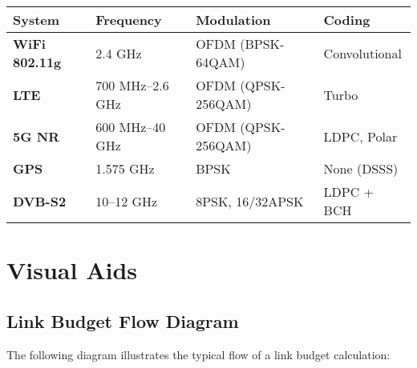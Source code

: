 \begin{center}
\begin{tabular}{@{}llll@{}}
\toprule
System & Frequency & Modulation & Coding \\
\midrule
\textbf{WiFi 802.11g} & 2.4 GHz & OFDM (BPSK-64QAM) & Convolutional \\
\textbf{LTE} & 700 MHz--2.6 GHz & OFDM (QPSK-256QAM) & Turbo \\
\textbf{5G NR} & 600 MHz--40 GHz & OFDM (QPSK-256QAM) & LDPC, Polar \\
\textbf{GPS} & 1.575 GHz & BPSK & None (DSSS) \\
\textbf{DVB-S2} & 10--12 GHz & 8PSK, 16/32APSK & LDPC + BCH \\
\bottomrule
\end{tabular}
\end{center}

\section{Visual Aids}
\label{sec:visual-aids}

\subsection{Link Budget Flow Diagram}

The following diagram illustrates the typical flow of a link budget calculation:

